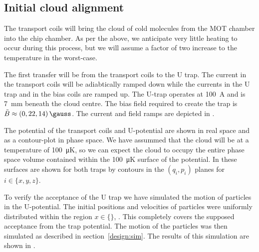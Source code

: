 \subsection{Initial cloud alignment}

The transport coils will bring the cloud of cold molecules from the MOT chamber
into the chip chamber. As per the above, we anticipate very little heating to
occur during this process, but we will assume a factor of two increase to the
temperature in the worst-case.

The first transfer will be from the transport coils to the U trap. The current
in the transport coils will be adiabtically ramped down while the currents in
the U trap and in the bias coils are ramped up. The U-trap operates at
\SI{100}{\ampere} and is \SI{7}{\milli\meter} beneath the cloud centre. The
bias field required to create the trap is $\tilde{B} \approx (0, 22,
14)\,\si{\gauss}$. The current and field ramps are depicted in .

The potential of the transport coils and U-potential are shown in
 real space and as a contour-plot in phase space. 
We have assummed that the cloud will be at a temperature of
\SI{100}{\micro\kelvin}, so we can expect the cloud to occupy the entire phase
space volume contained within the \SI{100}{\micro\kelvin} surface of the
potential. In  these surfaces are shown for both
traps by contours in the $(q_i, p_i)$ planes for $i\in\{x, y, z\}$. 

\begin{figure}[h]
\centering
  \caption{}
  \label{design:fig:chip}
\end{figure}

To verify the acceptance of the U trap we have simulated the motion of
particles in the U-potential. The initial positions and velocities of
 particles were uniformly distributed within the region $x \in \{\}$,
 . This completely covers the supposed acceptance from
the trap potential. The motion of the particles was then simulated as described
in section~\ref{design:sim}.  The results of
this simulation are shown in .

\begin{figure}[h]
\centering
  \caption{}
  \label{design:fig:Usim}
\end{figure}

